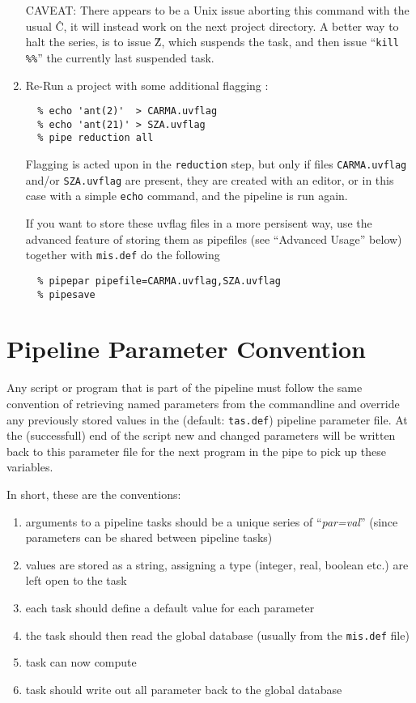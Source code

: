 \documentclass[preprint]{aastex} %
\begin{document}
\begin{enumerate}
CAVEAT: There appears to be a Unix issue aborting this command with the usual \^C,
it will instead work on the next project directory. A better way to halt the
series, is to issue \^Z, which suspends the task, and then issue 
``{\tt kill \%\%}'' the currently last suspended task.

\item
Re-Run a project with some additional flagging :
\footnotesize
\begin{verbatim}
  % echo 'ant(2)'  > CARMA.uvflag
  % echo 'ant(21)' > SZA.uvflag
  % pipe reduction all
\end{verbatim}
\normalsize

Flagging is acted upon in the {\tt reduction} step, but
only if files {\tt CARMA.uvflag} and/or
{\tt SZA.uvflag} are present, they are created with an editor, or
in this case with a simple {\tt echo} command, and the pipeline
is run again.

If you want to store these uvflag files in a more
persisent way, use the advanced feature of
storing them as pipefiles (see ``Advanced Usage'' below) together
with {\tt mis.def} do the following

\footnotesize
\begin{verbatim}
  % pipepar pipefile=CARMA.uvflag,SZA.uvflag
  % pipesave 
\end{verbatim}
\normalsize

\end{enumerate}


\section{Pipeline Parameter Convention}

Any script or program that is part of the pipeline
must follow the same convention of retrieving named
parameters from the commandline and override any previously stored
values in the (default: {\tt tas.def}) pipeline parameter file.
At the (successfull) end of the script new and changed parameters
will be written back to this parameter file for the next program in
the pipe to pick up these variables.

In short, these are the conventions:

\begin{enumerate}
\item
arguments to a pipeline tasks should be a unique series of ``{\it par=val}''
(since parameters can be shared between pipeline tasks)
\item
values are stored as a string, assigning a type (integer, real, boolean etc.) are
left open to the task
\item
each task should define a default value for each parameter
\item
the task should then read the global database (usually from the {\tt mis.def} file)
\item
task can now compute
\item
task should write out all parameter back to the global database
\end{enumerate}
\end{document}
